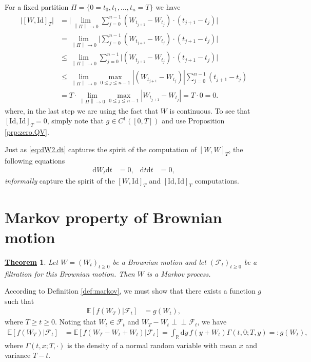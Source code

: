 \documentclass[12pt]{book}
\numberwithin{equation}{chapter}
\theoremstyle{plain}
\newtheorem{theorem}{\underline{Theorem}}
\numberwithin{theorem}{section}
\theoremstyle{definition}
\numberwithin{exercise}{chapter}
\let\oldendproof\endproof
\renewenvironment{proof}[1][\proofname]{%
  \oldproof[\scshape\underline{#1}]%
}{\oldendproof}
\newcommand{\<}{\langle}
\renewcommand{\>}{\rangle}
\renewcommand{\(}{\left(}
\renewcommand{\)}{\right)}
\renewcommand{\[}{\left[}
\renewcommand{\]}{\right]}
\newcommand\Eb{\mathds{E}}
\newcommand\Rb{\mathds{R}}
\newcommand\Fc{\mathscr{F}}
\newcommand\Gam{\Gamma}
\newcommand{\ind}{\perp \! \! \! \perp}
\newcommand\dd{\mathrm{d}}
\newcommand\Id{\text{Id}}
\newcommand{\norm}[1]{\left\|#1\right\|}
\begin{document}
\begin{proof}
For a fixed partition $\Pi = \{ 0 = t_0, t_1, \ldots, t_n = T \}$ we have
\begin{align}
\big| [W,\Id]_T \big|
	&=	\Big| \lim_{\norm{\Pi} \to 0 } \sum_{j=0}^{n-1}  (W_{t_{j+1}} - W_{t_j}) \cdot ( t_{j+1} - t_j ) \Big| \\
	&=	\lim_{\norm{\Pi} \to 0 } \Big| \sum_{j=0}^{n-1}  (W_{t_{j+1}} - W_{t_j}) \cdot ( t_{j+1} - t_j ) \Big| \\
	&\leq \lim_{\norm{\Pi} \to 0 } \sum_{j=0}^{n-1} \Big|  (W_{t_{j+1}} - W_{t_j}) \cdot ( t_{j+1} - t_j ) \Big| \\
	&\leq \lim_{\norm{\Pi} \to 0 } \max_{0 \leq j \leq n-1} |(W_{t_{j+1}} - W_{t_j})| \sum_{j=0}^{n-1}  ( t_{j+1} - t_j ) \\
	&=	 T  \cdot \lim_{\norm{\Pi} \to 0 } \max_{0 \leq j \leq n-1} | W_{t_{j+1}} - W_{t_j} |
	= T \cdot 0 = 0.
\end{align}
where, in the last step we are using the fact that $W$ is continuous.  To see that $[\Id,\Id]_T = 0$, simply note that $g \in C^1([0,T])$ and use Proposition \ref{prp:zero.QV}.
\end{proof}

\noindent
Just as \eqref{eq:dW2.dt} captures the spirit of the computation of $[W,W]_T$, the following equations
\begin{align}
\dd W_t \dd t
	&=	0 , &
\dd t \dd t
	&=	0 ,
\end{align}
\emph{informally} capture the spirit of the $[W,\Id]_T$ and $[\Id,\Id]_T$ computations.

\section{Markov property of Brownian motion}

\begin{theorem}
Let $W = (W_t)_{t \geq 0}$ be a Brownian motion and let $(\Fc_t)_{t \geq 0}$ be a filtration for this Brownian motion. Then $W$ is a Markov process.
\end{theorem}

\begin{proof}
According to Definition \ref{def:markov}, we must show that there exists a function $g$ such that
\begin{align}
\Eb[ f(W_T) | \Fc_t ]
	&=	g(W_t) ,
\end{align}
where $T \geq t \geq 0$.  Noting that $W_t \in \Fc_t$ and $W_T-W_t \ind \Fc_t$, we have
\begin{align}
\Eb[ f(W_T) | \Fc_t ]
	&=	\Eb[ f(W_T-W_t + W_t) | \Fc_t ]
	=		\int_\Rb \dd y \, f(y + W_t) \Gam(t,0;T,y) =: g(W_t) ,
\end{align}
where $\Gam(t,x;T,\cdot)$ is the density of a normal random variable with mean $x$ and variance $T-t$.
\end{proof}
\end{document}
